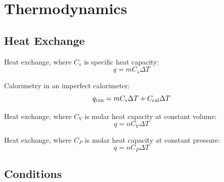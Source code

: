 \documentclass[10pt]{article}
\begin{document}

\section{Thermodynamics}


\subsection{Heat Exchange}

Heat exchange, where $C_s$ is specific heat capacity:
\begin{equation*}
q=mC_s\Delta T
\end{equation*}

Calorimetry in an imperfect calorimeter:
\begin{equation*}
q_\textnormal{rxn}=mC_s\Delta T + C_\textnormal{cal}\Delta T
\end{equation*}

Heat exchange, where $C_V$ is molar heat capacity at constant volume:
\begin{equation*}
q= nC_V\Delta T
\end{equation*}

Heat exchange, where $C_P$ is molar heat capacity at constant pressure:
\begin{equation*}
q= nC_P\Delta T
\end{equation*}


\subsection{Conditions}
\end{document}
